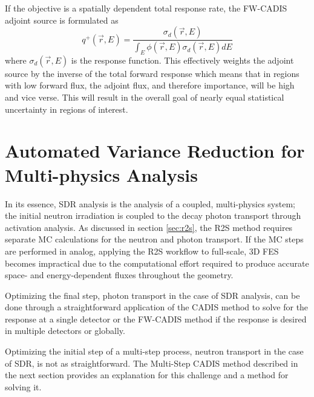 If the objective is a spatially dependent total response rate, the FW-CADIS 
adjoint source is formulated as
\begin{equation}
	q^{+}(\overrightarrow{r}, E) = \frac{\sigma_d(\overrightarrow{r}, E)}
	{\int_E
	 {\phi(\overrightarrow{r}, E)\sigma_d(\overrightarrow{r}, E)} dE}
\end{equation}
where $\sigma_d(\overrightarrow{r}, E) $ is the response function.
This effectively weights the adjoint source by the inverse of %
the total forward response
which means that in regions with low forward flux, the adjoint flux, and therefore
importance, will be high and vice verse.  This will result in the overall goal of
nearly equal statistical uncertainty in regions of interest.  

\section{Automated Variance Reduction for Multi-physics Analysis}\label{sec:auto_vr_sdr}

In its essence, SDR analysis is the analysis of a coupled, multi-physics system;
the initial neutron irradiation is coupled to the decay photon transport
through activation analysis.
As discussed in section \ref{sec:r2s}, the R2S method requires separate MC calculations 
for the neutron and photon transport.  If the MC steps are performed in analog,
applying the R2S workflow to full-scale, 3D FES becomes impractical 
due to the computational effort required
to produce accurate space- and energy-dependent fluxes throughout the geometry.

Optimizing the final step, photon transport in the case of SDR analysis,  
can be done through a straightforward application of the CADIS method to solve 
for the response at a single detector or the FW-CADIS method if the response is desired
in multiple detectors or globally. 

Optimizing the initial step of a multi-step process, neutron transport in the case of SDR, is not as
straightforward.
The Multi-Step CADIS method described in the next section 
provides an explanation for this challenge and a method for solving it.

